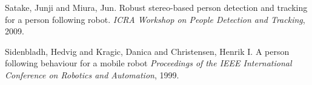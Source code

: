 \documentclass{svproc}
\begin{document}
\begin{thebibliography}{6}
Satake, Junji and Miura, Jun.
Robust stereo-based person detection and tracking for a person following robot.
\textit{ICRA Workshop on People Detection and Tracking}, 2009.


Sidenbladh, Hedvig and Kragic, Danica and Christensen, Henrik I.
A person following behaviour for a mobile robot
\textit{Proceedings of the IEEE International Conference on Robotics and Automation}, 1999. 

\end{thebibliography}
\end{document}
